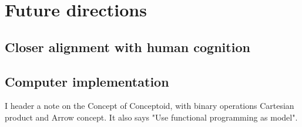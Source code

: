 
\section{Future directions}

\subsection{Closer alignment with human cognition}

\subsection{Computer implementation}

I header a note on the Concept of Conceptoid, with binary operations Cartesian product and Arrow concept. It also says "Use functional programming as model". 
